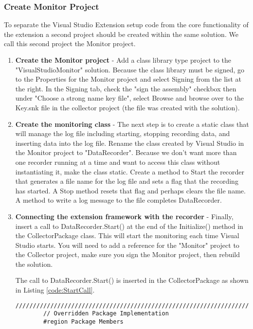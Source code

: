 \subsubsection{Create Monitor Project}

To separate the Visual Studio Extension setup code from the core functionality of the extension a second project should be created within the same solution. We call this second project  the Monitor project.

\begin{enumerate}
\item {\bf Create the Monitor project} - Add a class library type project to  the "VisualStudioMonitor" solution. Because the class library must be signed, go to the Properties for the Monitor project and select Signing from the list at the right.  In the Signing tab, check the "sign the assembly" checkbox then under "Choose a strong name key file", select Browse and browse over to the Key.snk file in the collector project (the file was created with the solution).

\item {\bf Create the monitoring class} - 
The next step is to create a static class that will manage the log file including starting, stopping recording data, and inserting data into the log file.  Rename the class created by Visual Studio in the Monitor project to "DataRecorder".    Because we don't want more than one recorder running at a time and want to access this class without instantiating it, make the class static.  Create a method to Start the recorder that generates a file name for the log file and sets a flag that the recording has started. A Stop method resets that flag and perhaps clears the file name.  A method to write a log message to the file completes DataRecorder.

\item {\bf Connecting the extension framework with the recorder} -
Finally, insert a call to DataRecorder.Start() at the end of the Initialize() method in the CollectorPackage class.  This will start the monitoring each time Visual Studio starts.  You will need to add a reference for the "Monitor" project to the Collector project, make sure you sign the Monitor project, then rebuild the solution.


The call to DataRecorder.Start() is inserted in the CollectorPackage as shown in Listing \ref{code:StartCall}.
\begin{lstlisting}[caption=Call to DataRecorder.Start(),label=code:StartCall]
        /////////////////////////////////////////////////////////////////////////////
        // Overridden Package Implementation
        #region Package Members


\end{lstlisting}
\end{enumerate}

